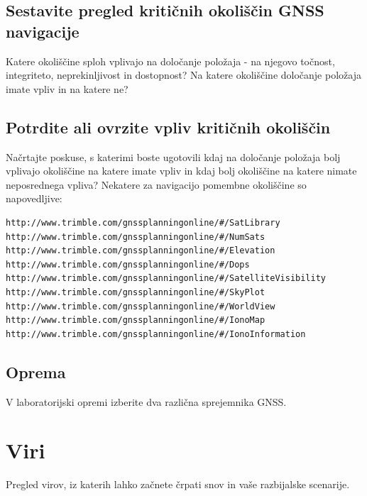 


\subsection{Sestavite pregled kritičnih okoliščin GNSS navigacije}
\label{subsec:GnssPrak_Podat}
Katere okoliščine sploh vplivajo na določanje položaja - na njegovo točnost, integriteto, neprekinljivost in dostopnost? Na katere okoliščine določanje položaja imate vpliv in na katere ne?

\subsection{Potrdite ali ovrzite vpliv kritičnih okoliščin}
\label{subsec:GnssPrak_Posk}
Načrtajte poskuse, s katerimi boste ugotovili kdaj na določanje položaja bolj vplivajo okoliščine na katere imate vpliv in kdaj bolj okoliščine na katere nimate neposrednega vpliva?
Nekatere za navigacijo pomembne okoliščine so napovedljive: 


\begin{verbatim} 
http://www.trimble.com/gnssplanningonline/#/SatLibrary
http://www.trimble.com/gnssplanningonline/#/NumSats
http://www.trimble.com/gnssplanningonline/#/Elevation
http://www.trimble.com/gnssplanningonline/#/Dops
http://www.trimble.com/gnssplanningonline/#/SatelliteVisibility
http://www.trimble.com/gnssplanningonline/#/SkyPlot
http://www.trimble.com/gnssplanningonline/#/WorldView
http://www.trimble.com/gnssplanningonline/#/IonoMap
http://www.trimble.com/gnssplanningonline/#/IonoInformation
\end{verbatim}
 

\subsection{Oprema}
\label{subsec:GnssPrak_Oprema}
V laboratorijski opremi izberite dva različna sprejemnika GNSS.


\section{Viri}
\label{sec:GnssPrak_Viri}

Pregled virov, iz katerih lahko začnete črpati snov in vaše razbijalske scenarije.

